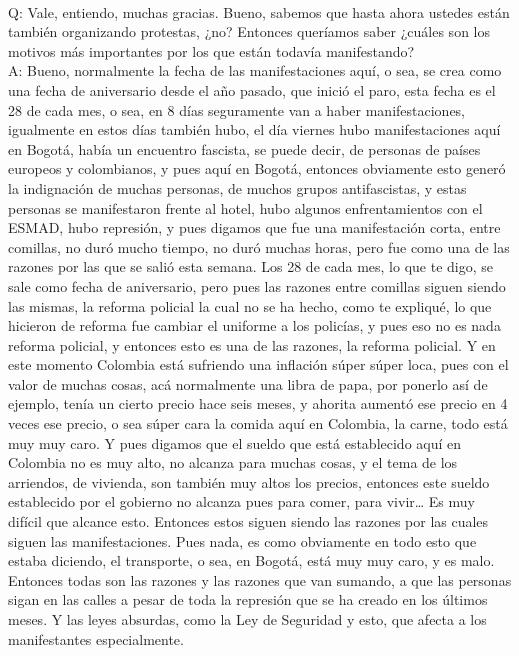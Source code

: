 \documentclass{phyasgn}\usepackage{nag}
\begin{document}
\\
Q: Vale, entiendo, muchas gracias. Bueno, sabemos que hasta ahora ustedes están también organizando protestas, ¿no? Entonces queríamos saber ¿cuáles son los motivos más importantes por los que están todavía manifestando?\\
A: Bueno, normalmente la fecha de las manifestaciones aquí, o sea, se crea como una fecha de aniversario desde el año pasado, que inició el paro, esta fecha es el 28 de cada mes, o sea, en 8 días seguramente van a haber manifestaciones, igualmente en estos días también hubo, el día viernes hubo manifestaciones aquí en Bogotá, había un encuentro fascista, se puede decir, de personas de países europeos y colombianos, y pues aquí en Bogotá, entonces obviamente esto generó la indignación de muchas personas, de muchos grupos antifascistas, y estas personas se manifestaron frente al hotel, hubo algunos enfrentamientos con el ESMAD, hubo represión, y pues digamos que fue una manifestación corta, entre comillas, no duró mucho tiempo, no duró muchas horas, pero fue como una de las razones por las que se salió esta semana. Los 28 de cada mes, lo que te digo, se sale como fecha de aniversario, pero pues las razones entre comillas siguen siendo las mismas, la reforma policial la cual no se ha hecho, como te expliqué, lo que hicieron de reforma fue cambiar el uniforme a los policías, y pues eso no es nada reforma policial, y entonces esto es una de las razones, la reforma policial. Y en este momento Colombia está sufriendo una inflación súper súper loca, pues con el valor de muchas cosas, acá normalmente una libra de papa, por ponerlo así de ejemplo, tenía un cierto precio hace seis meses, y ahorita aumentó ese precio en 4 veces ese precio, o sea súper cara la comida aquí en Colombia, la carne, todo está muy muy caro. Y pues digamos que el sueldo que está establecido aquí en Colombia no es muy alto, no alcanza para muchas cosas, y el tema de los arriendos, de vivienda, son también muy altos los precios, entonces este sueldo establecido por el gobierno no alcanza pues para comer, para vivir… Es muy difícil que alcance esto. Entonces estos siguen siendo las razones por las cuales siguen las manifestaciones. Pues nada, es como obviamente en todo esto que estaba diciendo, el transporte, o sea, en Bogotá, está muy muy caro, y es malo. Entonces todas son las razones y las razones que van sumando, a que las personas sigan en las calles a pesar de toda la represión que se ha creado en los últimos meses. Y las leyes absurdas, como la Ley de Seguridad y esto, que afecta a los manifestantes especialmente. \\
\end{document}
